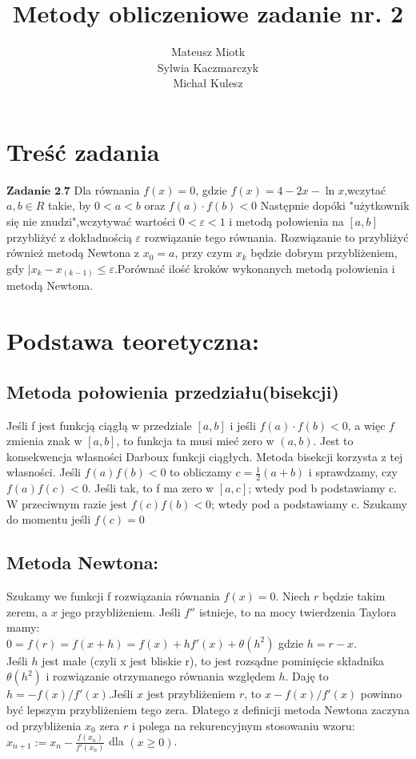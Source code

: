 \documentclass[11pt]{article} %
\title{Metody obliczeniowe zadanie nr. 2}
\author{Mateusz Miotk \\ Sylwia Kaczmarczyk \\ Michał Kulesz}
\date{} %
\begin{document}
\maketitle

\section{Treść zadania}

$\textbf {Zadanie 2.7}$ Dla równania $f(x) = 0$, gdzie $f(x)=4-2x-\ln x$,wczytać $ a,b \in R$ takie, by $0<a<b$ oraz $f(a)\cdot f(b)<0$ Następnie dopóki "użytkownik się nie znudzi",wczytywać wartości $0<\varepsilon<1 $ i metodą połowienia na $[a,b]$ przybliżyć z dokładnością $\varepsilon$ rozwiązanie tego równania. Rozwiązanie to przybliżyć również metodą Newtona z $x_0=a$, przy czym $x_k$ będzie dobrym przybliżeniem, gdy $|x_k-x_(k-1)\le \varepsilon$.Porównać ilość kroków wykonanych metodą połowienia i metodą Newtona. 

\section {Podstawa teoretyczna:}
\subsection{Metoda połowienia przedziału(bisekcji)}
Jeśli f jest funkcją ciągłą w przedziale $[a,b]$ i jeśli $f(a) \cdot f(b) < 0 $, a więc $f$ zmienia znak w $[a,b]$, to funkcja ta musi mieć zero w $(a,b)$. Jest to konsekwencja własności Darboux funkcji ciągłych. Metoda bisekcji korzysta z tej własności. Jeśli $f(a)f(b) < 0 $ to obliczamy $c=\frac{1}{2}(a+b)$ i sprawdzamy, czy $f(a)f(c) < 0$. Jeśli tak, to f ma zero w $[a,c]$; wtedy pod b podstawiamy c. W przeciwnym razie jest $f(c)f(b) < 0$; wtedy pod a podstawiamy c. Szukamy do momentu jeśli $f(c)=0$
\subsection{Metoda Newtona:}
Szukamy we funkcji f rozwiązania równania $f(x)=0$. Niech $r$ będzie takim zerem, a $x$ jego przybliżeniem. Jeśli $f''$ istnieje, to na mocy twierdzenia Taylora mamy: \\
$0=f(r)=f(x+h)=f(x)+hf'(x) + \theta(h^2)$
gdzie $h=r-x$.\\ Jeśli $h$ jest małe (czyli x jest bliskie r), to jest rozsądne pominięcie składnika $\theta(h^2)$ i rozwiązanie otrzymanego równania względem $h$. Daję to $h=-f(x)/f'(x)$.Jeśli $x$ jest przybliżeniem $r$, to $x-f(x)/f'(x)$ powinno być lepszym przybliżeniem tego zera. Dlatego z definicji metoda Newtona zaczyna od przybliżenia $x_0$ zera $r$ i polega na rekurencyjnym stosowaniu wzoru:\\
$x_{n+1}:=x_n - \frac{f(x_n)}{f'(x_n)}$ dla $(x\ge 0)$.
\end{document}
